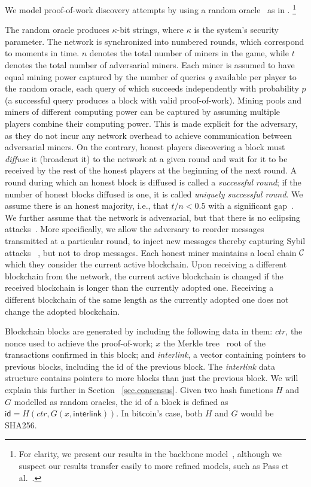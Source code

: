 We model proof-of-work discovery attempts by using a random oracle~\cite{RO} as
in \cite{backbone}.%
\footnote{For clarity, we present our results in the backbone model~\cite{backbone}, although we suspect our results transfer easily to more refined models, such as Pass et al.~\cite{PSS}.}%

The random oracle produces $\kappa$-bit strings, where
$\kappa$ is the system's security parameter. The network is synchronized into
numbered rounds, which correspond to moments in time. $n$ denotes the total
number of miners in the game, while $t$ denotes the total number of adversarial
miners. Each miner is assumed to have equal mining power captured by the number
of queries $q$ available per player to the random oracle, each query of which
succeeds independently with probability $p$ (a successful query produces a block
with valid proof-of-work). Mining pools and miners of different computing power
can be captured by assuming multiple players combine their computing power. This
is made explicit for the adversary, as they do not incur any network overhead to
achieve communication between adversarial miners. On the contrary, honest
players discovering a block must \textit{diffuse} it (broadcast it) to the
network at a given round and wait for it to be received by the rest of the
honest players at the beginning of the next round. A round during which an
honest block is diffused is called a \textit{successful round}; if the number of
honest blocks diffused is one, it is called \textit{uniquely successful round}.
We assume there is an honest majority, i.e., that $t / n < 0.5$ with a
significant gap~\cite{backbone}. We further assume that the network is
adversarial, but that there is no eclipsing attacks~\cite{heilman2015eclipse}. More
specifically, we allow the adversary to reorder messages transmitted at a
particular round, to inject new messages thereby capturing Sybil attacks~
\cite{sybil}, but not to drop messages. Each honest miner maintains a local
chain $\mathcal{C}$ which they consider the current active blockchain. Upon receiving
a different blockchain from the network, the current active blockchain is
changed if the received blockchain is longer than the currently adopted one.
Receiving a different blockchain of the same length as the currently adopted one
does not change the adopted blockchain.

Blockchain blocks are generated by including the following data in them: $ctr$,
the nonce used to achieve the proof-of-work; $x$ the Merkle tree~\cite{merkle} root of the
transactions confirmed in this block; and \textit{interlink}, a vector
containing pointers to previous blocks, including the id of the previous block.
The \textit{interlink} data structure contains pointers to more blocks than just
the previous block. We will explain this further in Section~
\ref{sec.consensus}. Given two hash functions $H$ and $G$ modelled as random
oracles, the id of a block is defined as $\textsf{id} = H(ctr, G(x,
\textsf{interlink}))$. In bitcoin's case, both $H$ and $G$ would be SHA256.

